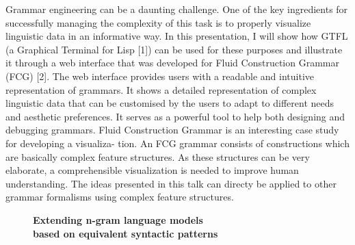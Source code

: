 \documentclass[10pt, a4paper, twopage, headinclude, footinclude, BCOR5mm]{scrartcl}
\begin{document}
\noindent
Grammar engineering can be a daunting challenge. One of the key ingredients for successfully managing the complexity of this task is to properly visualize linguistic data in an informative way. In this presentation, I will show how GTFL (a Graphical Terminal for Lisp [1]) can be used for these purposes and illustrate it through a web interface that was developed for Fluid Construction Grammar (FCG) [2]. The web interface provides users with a readable and intuitive representation of grammars. It shows a detailed representation of complex linguistic data that can be customised by the users to adapt to different needs and aesthetic preferences. It serves as a powerful tool to help both designing and debugging grammars. Fluid Construction Grammar is an interesting case study for developing a visualiza- tion. An FCG grammar consists of constructions which are basically complex feature structures. As these structures can be very elaborate, a comprehensible visualization is needed to improve human understanding. The ideas presented in this talk can directy be applied to other grammar formalisms using complex feature structures.


\newpage

\begin{figure}[t!]
\centering
\large\textbf{Extending n-gram language models \\ based on equivalent syntactic patterns}
\vspace*{0.5cm}
\end{figure}


        \begin{table}[t!]
    \end{table}
\end{document}
